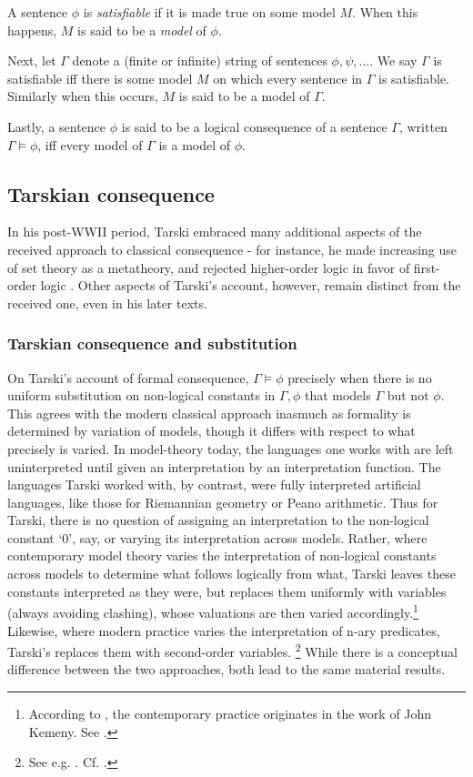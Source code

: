 \documentclass[]{article}
\begin{document}
A sentence $\phi$ is \textit{satisfiable} if it is made true on some model $M$. When this happens, $M$ is said to be a \textit{model} of $\phi$. 

Next, let $\Gamma$ denote a (finite or infinite) string of sentences $\phi, \psi, ...$. We say $\Gamma$ is satisfiable iff there is some model $M$ on which every sentence in $\Gamma$ is satisfiable. Similarly when this occurs, $M$ is said to be a model of $\Gamma$. 

Lastly, a sentence $\phi$ is said to be a logical consequence of a sentence $\Gamma$, written $\Gamma \models \phi$, iff every model of $\Gamma$ is a model of $\phi$.
\subsection{Tarskian consequence}
In his post-WWII period, 
Tarski embraced many additional aspects of the received approach to classical consequence - 
for instance, 
he made increasing use of set theory as a metatheory, 
and rejected higher-order logic in favor of first-order logic \cite{Tarski1987} \cite[372]{Corcoran2011}.
Other aspects of Tarski's account, however, 
remain distinct from the received one, even in his later texts. 

\subsubsection{Tarskian consequence and substitution}
On Tarski's account of formal consequence, 
$\Gamma \models \phi$ precisely when there is no uniform substitution on non-logical constants in $\Gamma, \phi$ that models $\Gamma$ but not $\phi$. 
This agrees with the modern classical approach inasmuch as formality is determined by variation of models, though it differs with respect to what precisely is varied. 
In model-theory today, 
the languages one works with are left uninterpreted until given an interpretation by an interpretation function. 
The languages Tarski worked with, 
by contrast, 
were fully interpreted artificial languages, 
like those for Riemannian geometry or Peano arithmetic. 
Thus for Tarski, 
there is no question of assigning an interpretation to the non-logical constant `0', say, 
or varying its interpretation across models. 
Rather, where contemporary model theory varies the interpretation of non-logical constants across models to determine what follows logically from what, 
Tarski leaves these constants interpreted as they were, 
but replaces them uniformly with variables (always avoiding clashing), 
whose valuations are then varied accordingly.\footnote{According to \cite[433]{Schiemer2013}, the contemporary practice originates in the work of John Kemeny. See \cite{Kemeny1956} \cite{Kemeny1956b}.} 
Likewise, where modern practice varies the interpretation of n-ary predicates, Tarski's replaces them with second-order variables. \footnote{See e.g. \cite[122-23]{Tarski1941}. Cf. \cite[69]{Etchemendy1988} \cite[448]{Schiemer2013}.} While there is a conceptual difference between the two approaches, both lead to the same material results.
\end{document}
